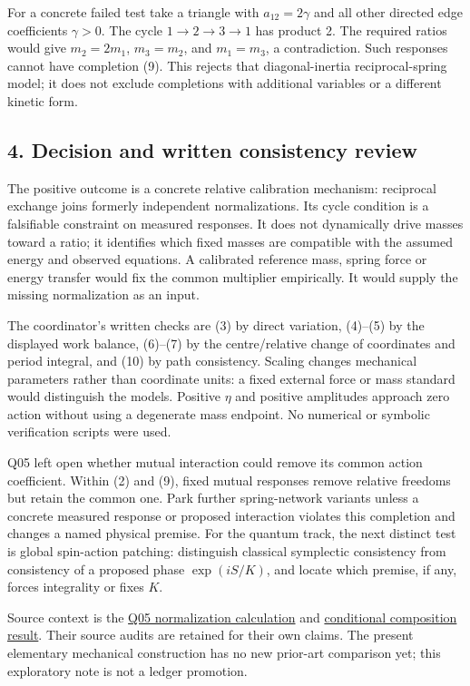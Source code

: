 \documentclass[11pt,a4paper]{article}
\begin{document}
For a concrete failed test take a triangle with \(a_{12}=2\gamma\) and
all other directed edge coefficients \(\gamma>0\). The cycle
\(1\to2\to3\to1\) has product 2. The required ratios would give
\(m_2=2m_1\), \(m_3=m_2\), and \(m_1=m_3\), a contradiction. Such
responses cannot have completion (9). This rejects that diagonal-inertia
reciprocal-spring model; it does not exclude completions with additional
variables or a different kinetic form.

\hypertarget{decision-and-written-consistency-review}{%
\subsection{4. Decision and written consistency
review}\label{decision-and-written-consistency-review}}

The positive outcome is a concrete relative calibration mechanism:
reciprocal exchange joins formerly independent normalizations. Its cycle
condition is a falsifiable constraint on measured responses. It does not
dynamically drive masses toward a ratio; it identifies which fixed
masses are compatible with the assumed energy and observed equations. A
calibrated reference mass, spring force or energy transfer would fix the
common multiplier empirically. It would supply the missing normalization
as an input.

The coordinator's written checks are (3) by direct variation, (4)--(5)
by the displayed work balance, (6)--(7) by the centre/relative change of
coordinates and period integral, and (10) by path consistency. Scaling
changes mechanical parameters rather than coordinate units: a fixed
external force or mass standard would distinguish the models. Positive
\(\eta\) and positive amplitudes approach zero action without using a
degenerate mass endpoint. No numerical or symbolic verification scripts
were used.

Q05 left open whether mutual interaction could remove its common action
coefficient. Within (2) and (9), fixed mutual responses remove relative
freedoms but retain the common one. Park further spring-network variants
unless a concrete measured response or proposed interaction violates
this completion and changes a named physical premise. For the quantum
track, the next distinct test is global spin-action patching:
distinguish classical symplectic consistency from consistency of a
proposed phase \(\exp(iS/K)\), and locate which premise, if any, forces
integrality or fixes \(K\).

Source context is the
\href{topological-sector-action-selection.md\#a-stabilized-three-dimensional-trial-family}{Q05
normalization calculation} and
\href{composition-universality.md}{conditional composition result}.
Their source audits are retained for their own claims. The present
elementary mechanical construction has no new prior-art comparison yet;
this exploratory note is not a ledger promotion.
\end{document}
